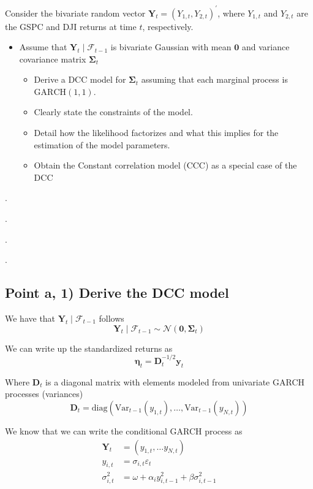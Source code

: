 \documentclass{article}
\begin{document}
Consider the bivariate random vector $\mathbf{Y}_{t}=\left(Y_{1,t},Y_{2,t}\right)^{\prime}$,
where $Y_{1,t}$ and $Y_{2,t}$ are the GSPC and DJI returns at time
$t$, respectively. 
\begin{itemize}
\item Assume that $\mathbf{Y}_{t}\mid\mathcal{F}_{t-1}$ is bivariate Gaussian
with mean $\mathbf{0}$ and variance covariance matrix $\boldsymbol{\Sigma}_{t}$ 
\begin{itemize}
\item Derive a DCC model for $\boldsymbol{\Sigma}_{t}$ assuming that each
marginal process is $\text{GARCH}\left(1,1\right)$. 
\item Clearly state the constraints of the model. 
\item Detail how the likelihood factorizes and what this implies for the
estimation of the model parameters.
\item Obtain the Constant correlation model (CCC) as a special case of the
DCC
\end{itemize}
\end{itemize}
.

.

.

.

\subsection{Point a, 1) Derive the DCC model}

We have that $\mathbf{Y}_{t}\mid\mathcal{F}_{t-1}$ follows
\[
\mathbf{Y}_{t}\mid\mathcal{F}_{t-1}\sim\mathcal{N}\left(\mathbf{0},\boldsymbol{\Sigma}_{t}\right)
\]

We can write up the standardized returns as 
\[
\boldsymbol{\eta}_{t}=\mathbf{D}_{t}^{-1/2}\mathbf{y}_{t}
\]

Where $\mathbf{D}_{t}$ is a diagonal matrix with elements modeled
from univariate GARCH processes (variances)
\[
\mathbf{D}_{t}=\text{diag}\left(\text{Var}_{t-1}\left(y_{1,t}\right),\dots,\text{Var}_{t-1}\left(y_{N,t}\right)\right)
\]

We know that we can write the conditional GARCH process as 
\begin{align*}
\mathbf{Y}_{t} & =\left(y_{1,t},\dots y_{N,t}\right)\\
y_{i,t} & =\sigma_{i,t}\varepsilon_{t}\\
\sigma_{i,t}^{2} & =\omega+\alpha_{i}y_{i,t-1}^{2}+\beta\sigma_{i,t-1}^{2}
\end{align*}
\end{document}
